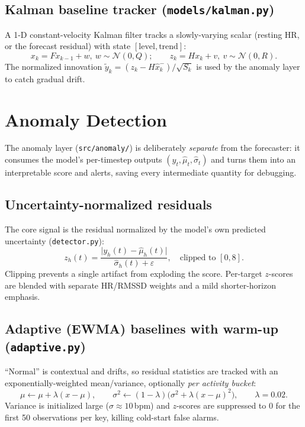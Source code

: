 \documentclass[11pt,a4paper]{article}
\newcommand{\code}[1]{\lstinline[basicstyle=\ttfamily\normalsize]!#1!}
\begin{document}
\subsection{Kalman baseline tracker (\texttt{models/kalman.py})}
A 1-D constant-velocity Kalman filter tracks a slowly-varying scalar (resting HR,
or the forecast residual) with state $[\text{level},\text{trend}]$:
\[
x_k=Fx_{k-1}+w,\ w\sim\mathcal N(0,Q);\qquad z_k=Hx_k+v,\ v\sim\mathcal N(0,R).
\]
The normalized innovation $\tilde y_k=(z_k-H\hat x_{k}^-)/\sqrt{S_k}$ is used by
the anomaly layer to catch gradual drift.

\section{Anomaly Detection}\label{sec:anomaly}

The anomaly layer (\code{src/anomaly/}) is deliberately \emph{separate} from the
forecaster: it consumes the model's per-timestep outputs
$(y_t, \hat\mu_t, \hat\sigma_t)$ and turns them into an interpretable score and
alerts, saving every intermediate quantity for debugging.

\subsection{Uncertainty-normalized residuals}
The core signal is the residual normalized by the model's own predicted
uncertainty (\code{detector.py}):
\[
z_h(t)=\frac{\lvert y_h(t)-\hat\mu_h(t)\rvert}{\hat\sigma_h(t)+\varepsilon},
\quad \text{clipped to }[0,8].
\]
Clipping prevents a single artifact from exploding the score. Per-target
$z$-scores are blended with separate HR/RMSSD weights and a mild shorter-horizon
emphasis.

\subsection{Adaptive (EWMA) baselines with warm-up (\texttt{adaptive.py})}
``Normal'' is contextual and drifts, so residual statistics are tracked with an
exponentially-weighted mean/variance, optionally \emph{per activity bucket}:
\[
\mu \leftarrow \mu + \lambda(x-\mu),\qquad
\sigma^2 \leftarrow (1-\lambda)\big(\sigma^2+\lambda(x-\mu)^2\big),\qquad \lambda=0.02.
\]
Variance is initialized large ($\sigma\!\approx\!10$\,bpm) and $z$-scores are
suppressed to 0 for the first 50 observations per key, killing cold-start false
alarms.
\end{document}
